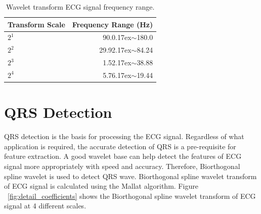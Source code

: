 \renewcommand{\arraystretch}{2}
\begin{table}
	\caption{Wavelet transform ECG signal frequency range\cite{shang2014qrs}.} \label{tab:qrsenergy}
	
	\begin{center}
		\begin{tabular}{ | l | r | }
			\hline
			Transform Scale & Frequency Range (Hz) \\ \hline
			${2^1}$  & 90.0{\raise.17ex\hbox{$\scriptstyle\sim$}}180.0 \\ \hline
			${2^2}$  & 29.92{\raise.17ex\hbox{$\scriptstyle\sim$}}84.24  \\ \hline
			${2^3}$  & 1.52{\raise.17ex\hbox{$\scriptstyle\sim$}}38.88  \\ \hline
			${2^4}$  & 5.76{\raise.17ex\hbox{$\scriptstyle\sim$}}19.44  \\ 
			\hline
		\end{tabular}
	\end{center}
	
\end{table}


\section{QRS Detection}\label{sec:ecg_det}
QRS detection is the basis for processing the ECG signal. Regardless of what application is required, the accurate detection of QRS is a pre-requisite for feature extraction. A good wavelet base can help detect the features of ECG signal more appropriately with speed and accuracy. Therefore, Biorthogonal spline wavelet is used to detect QRS wave. Biorthogonal spline wavelet transform of ECG signal is calculated using the Mallat algorithm. Figure ~\ref{fig:detail_coefficients} shows the Biorthogonal spline wavelet transform of ECG signal at 4 different scales.

